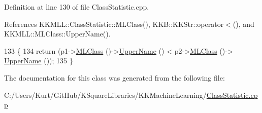 Definition at line 130 of file Class\+Statistic.\+cpp.



References K\+K\+M\+L\+L\+::\+Class\+Statistic\+::\+M\+L\+Class(), K\+K\+B\+::\+K\+K\+Str\+::operator$<$(), and K\+K\+M\+L\+L\+::\+M\+L\+Class\+::\+Upper\+Name().


\begin{DoxyCode}
133    \{
134      \textcolor{keywordflow}{return}  (p1->\hyperlink{class_k_k_m_l_l_1_1_class_statistic_a7f2775bca7634dd376ffe3c804e65c3e}{MLClass} ()->\hyperlink{class_k_k_m_l_l_1_1_m_l_class_a3e688259223abd20da71a18a9877fbc4}{UpperName} () < p2->\hyperlink{class_k_k_m_l_l_1_1_class_statistic_a7f2775bca7634dd376ffe3c804e65c3e}{MLClass} ()->
      \hyperlink{class_k_k_m_l_l_1_1_m_l_class_a3e688259223abd20da71a18a9877fbc4}{UpperName} ());
135    \}
\end{DoxyCode}


The documentation for this class was generated from the following file\+:\begin{DoxyCompactItemize}
\item 
C\+:/\+Users/\+Kurt/\+Git\+Hub/\+K\+Square\+Libraries/\+K\+K\+Machine\+Learning/\hyperlink{_class_statistic_8cpp}{Class\+Statistic.\+cpp}\end{DoxyCompactItemize}
